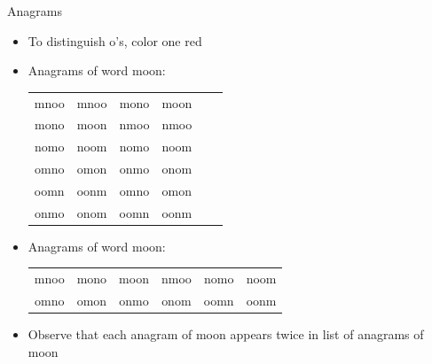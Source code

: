 \documentclass[handout]{beamer}
\theoremstyle{definition}
\begin{document}

\begin{frame}{Anagrams}
\begin{itemize}
\item To distinguish o's, color one red
\item Anagrams of word mo\alert{o}n:
\begin{tabular}{cccccc}
mno\alert{o}&mn\alert{o}o&mon\alert{o}&mo\alert{o}n\\
m\alert{o}no&m\alert{o}on&nmo\alert{o}&nm\alert{o}o\\
nom\alert{o}&no\alert{o}m&n\alert{o}mo&n\alert{o}om\\
omn\alert{o}&om\alert{o}n&onm\alert{o}&on\alert{o}m\\
o\alert{o}mn&o\alert{o}nm&\alert{o}mno&\alert{o}mon\\
\alert{o}nmo&\alert{o}nom&\alert{o}omn&\alert{o}onm
\end{tabular}
\item Anagrams of word moon:
\begin{tabular}{cccccc}
mnoo &mono &moon &nmoo &nomo &noom\\
omno &omon &onmo &onom &oomn &oonm 
\end{tabular}
\item Observe that each anagram of moon
appears \alert{twice} in list of anagrams of mo\alert{o}n 
\end{itemize}
\end{frame}
\end{document}
